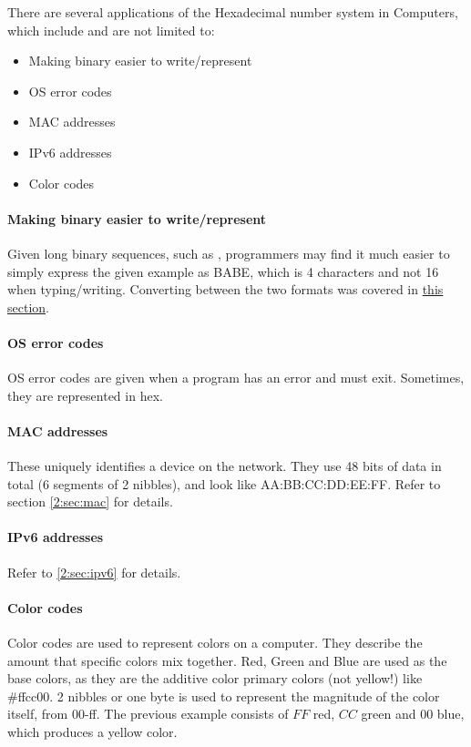 \documentclass[../main.tex]{subfiles}
\begin{document}
There are several applications of the Hexadecimal number system in Computers, which include and are not limited to:

\begin{itemize}
    \item Making binary easier to write/represent
    \item OS error codes
    \item MAC addresses
    \item IPv6 addresses
    \item Color codes
\end{itemize}

\paragraph{Making binary easier to write/represent}

Given long binary sequences, such as {}, programmers may find it much easier to simply express the given example as {\mono BABE}, which is 4 characters and not 16 when typing/writing. Converting between the two formats was covered in \hyperref[sec:1-converting-between-bin-den-and-hexadecimal]{this section}.

\paragraph{OS error codes}

OS error codes are given when a program has an error and must exit. Sometimes, they are represented in hex.

\paragraph{MAC addresses}

These uniquely identifies a device on the network. They use 48 bits of data in total (6 segments of 2 nibbles), and look like {\mono AA:BB:CC:DD:EE:FF}. Refer to section \ref{2:sec:mac} for details.

\paragraph{IPv6 addresses}

Refer to \ref{2:sec:ipv6} for details.

\paragraph{Color codes}

Color codes are used to represent colors on a computer. They describe the amount that specific colors mix together. Red, Green and Blue are used as the base colors, as they are the additive color primary colors (not yellow!) like {\mono \#ffcc00}. 2 nibbles or one byte is used to represent the magnitude of the color itself, from 00-ff. The previous example consists of $FF$ red, $CC$ green and $00$ blue, which produces a yellow color.
\end{document}
